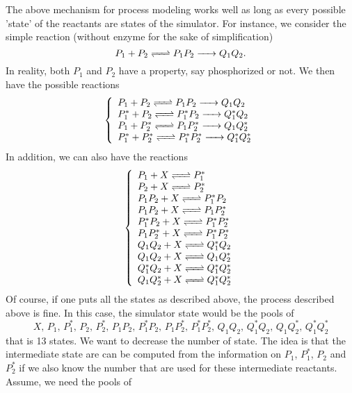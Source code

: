 The above mechanism for process modeling works well as long as every possible 'state' of the reactants are states of the simulator. For instance, we consider the simple reaction (without enzyme for the sake of simplification)
$$
  \reactionIrr{\reactionRev{P_1+P_2}{P_1P_2}{}{}}{Q_1Q_2}{}{}.
$$
In reality, both $P_1$ and $P_2$ have a property, say phosphorized or not. We then have the possible reactions
$$
  \left\{
    \begin{array}{l}
      \reactionIrr{\reactionRev{P_1+P_2}{P_1P_2}{}{}}{Q_1Q_2}{}{} \\
      \reactionIrr{\reactionRev{P_1^*+P_2}{P_1^*P_2}{}{}}{Q_1^*Q_2}{}{} \\
      \reactionIrr{\reactionRev{P_1+P_2^*}{P_1P_2^*}{}{}}{Q_1Q_2^*}{}{} \\
      \reactionIrr{\reactionRev{P_1^*+P_2^*}{P_1^*P_2^*}{}{}}{Q_1^*Q_2^*}{}{} \\
    \end{array}
  \right.
$$
In addition, we can also have the reactions
$$
  \left\{
    \begin{array}{l}
      \reactionRev{P_1 + X}{P_1^*}{}{} \\
      \reactionRev{P_2 + X}{P_2^*}{}{} \\
      \reactionRev{P_1P_2 + X}{P_1^*P_2}{}{} \\
      \reactionRev{P_1P_2 + X}{P_1P_2^*}{}{} \\
      \reactionRev{P_1^*P_2 + X}{P_1^*P_2^*}{}{} \\
      \reactionRev{P_1P_2^* + X}{P_1^*P_2^*}{}{} \\
      \reactionRev{Q_1Q_2 + X}{Q_1^*Q_2}{}{} \\
      \reactionRev{Q_1Q_2 + X}{Q_1Q_2^*}{}{} \\
      \reactionRev{Q_1^*Q_2 + X}{Q_1^*Q_2^*}{}{} \\
      \reactionRev{Q_1Q_2^* + X}{Q_1^*Q_2^*}{}{} \\
    \end{array}
  \right.
$$
Of course, if one puts all the states as described above, the process described above is fine. In this case, the simulator state would be the pools of
$$
  X,\,P_1,\,P_1^*,\,P_2,\,P_2^*,\,P_1P_2,\,P_1^*P_2,\,P_1P_2^*,\,P_1^*P_2^*,\,Q_1Q_2,\,Q_1^*Q_2,\,Q_1Q_2^*,\,Q_1^*Q_2^*
$$
that is 13 states. We want to decrease the number of state. The idea is that the intermediate state are can be computed from the information on $P_1$, $P_1^*$, $P_2$ and $P_2^*$ if we also know the number that are used for these intermediate reactants. Assume, we need the pools of
